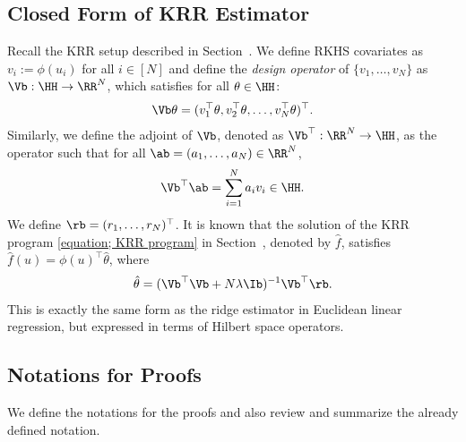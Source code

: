 \documentclass[12pt,a4paper,pdftex,onepage]{article}
\begin{document}
\subsection{Closed Form of KRR Estimator}
Recall the KRR setup described in Section~. 
We define RKHS covariates as $v_i := \phi(u_i)$ for all $i \in [N]$ and define the \emph{design operator} of \(\{v_1, \dots, v_N \}\) as $\Vb: \HH \to \RR^N$, which satisfies for all \(\theta \in \HH\):
\begin{align*}
\Vb \theta = (v_1^\top \theta, v_2^\top \theta, \dots, v_N^\top \theta)^\top.
\end{align*}
Similarly, we define the adjoint of \(\Vb\), denoted as \(\Vb^\top: \RR^N \to \HH \), as the operator such that for all \(\ab =(a_1, \dots, a_N) \in \RR^N\),
\begin{align*}
\Vb^\top \ab= \sum_{i=1}^N a_i v_i \in \HH.
\end{align*}
We define \(\rb =(r_1, \dots, r_N)^\top \).
It is known that the solution of the KRR program \eqref{equation; KRR program} in Section~, denoted by $\hat{f}$, satisfies
\(\hat{f}(u) = \phi(u)^\top \hat{\theta}\), where 
\begin{align*}
\hat{\theta} =(\Vb^\top \Vb + N\lambda \Ib)^{-1} \Vb^\top \rb.
\end{align*}
This is exactly the same form as the ridge estimator in Euclidean linear regression, but expressed in terms of Hilbert space operators.

\subsection{Notations for Proofs}\label{subsection; notations}
We define the notations for the proofs and also review and summarize the already defined notation.
\end{document}
